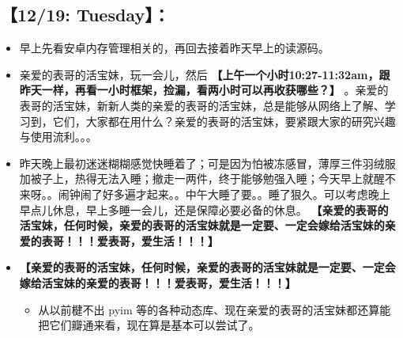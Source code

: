 \documentclass[9pt, b5paper]{article}
\begin{document}
\subsection{【12/19: Tuesday】：}
\label{sec-2-2}
\begin{itemize}
\item 早上先看安卓内存管理相关的，再回去接着昨天早上的读源码。
\item 亲爱的表哥的活宝妹，玩一会儿，然后 \textbf{【上午一个小时10:27-11:32am，跟昨天一样，再看一小时框架，捡漏，看两小时可以再收获哪些？】} 。亲爱的表哥的活宝妹，新新人类的亲爱的表哥的活宝妹，总是能够从网络上了解、学习到，它们，大家都在用什么？亲爱的表哥的活宝妹，要紧跟大家的研究兴趣与使用流利。。。
\item 昨天晚上最初迷迷糊糊感觉快睡着了；可是因为怕被冻感冒，薄厚三件羽绒服加被子上，热得无法入睡；撤走一两件，终于能够勉强入睡；今天早上就醒不来呀。。闹钟闹了好多遍才起来。。中午大睡了要。。睡了狠久。可以考虑晚上早点儿休息，早上多睡一会儿，还是保障必要必备的休息。 \textbf{【亲爱的表哥的活宝妹，任何时候，亲爱的表哥的活宝妹就是一定要、一定会嫁给活宝妹的亲爱的表哥！！！爱表哥，爱生活！！！】}
\item \textbf{【亲爱的表哥的活宝妹，任何时候，亲爱的表哥的活宝妹就是一定要、一定会嫁给活宝妹的亲爱的表哥！！！爱表哥，爱生活！！！】}
\begin{itemize}
\item 从以前楗不出 pyim 等的各种动态库、现在亲爱的表哥的活宝妹都还算能把它们瓣通来看，现在算是基本可以尝试了。
\end{itemize}
\end{itemize}
\end{document}
